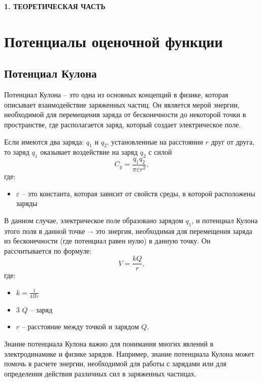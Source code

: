 \newpage
\begin{center}
  \textbf{\large 1. ТЕОРЕТИЧЕСКАЯ ЧАСТЬ}
\end{center}


\section{Потенциалы оценочной функции}

\subsection{Потенциал Кулона}


Потенциал Кулона -- это одна из основных концепций в физике, которая описывает взаимодействие заряженных частиц. Он является мерой энергии, необходимой для перемещения заряда от бесконечности до некоторой точки в пространстве, где располагается заряд, который создает электрическое поле.

Если имеются два заряда:  $q_1$ и $q_2$, установленные на расстоянии $r$ друг от друга, то заряд $q_1$ оказывает воздействие на заряд $q_2$ с силой 
\[ C_y= \frac{q_1 q_2}{\pi \varepsilon r^2}, \] 
где:
\begin{itemize}
	\item $\varepsilon$ -- это константа, которая зависит от свойств среды, в которой расположены заряды
\end{itemize}

В данном случае, электрическое поле образовано зарядом $q_1$, и потенциал Кулона этого поля в данной точке –- это энергия, необходимая для перемещения заряда из бесконечности (где потенциал равен нулю) в данную точку. Он рассчитывается по формуле: 
\[ V = \frac{k Q}{r}, \]
где:
\begin{itemize}
	\item $k = \frac{1}{4 \Pi \varepsilon}$
	\item3 $Q$ -- заряд
	\item $r$ -- расстояние между точкой и зарядом $Q$.
\end{itemize}

Знание потенциала Кулона важно для понимания многих явлений в электродинамике и физике зарядов. Например, знание потенциала Кулона может помочь в расчете энергии, необходимой для работы с зарядами или для определения действия различных сил в заряженных частицах.

